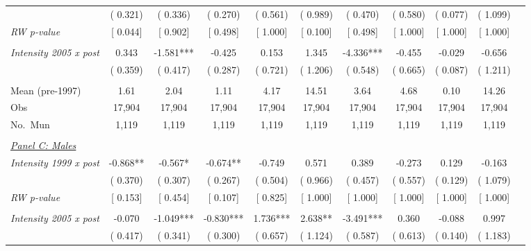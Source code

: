 \begin{tabular}{lcccccccccc}
 & (       0.321) & (       0.336) & (       0.270) & (       0.561) & (       0.989) & (       0.470) & (       0.580) & (       0.077) & (       1.099) \\ 
\textit{RW p-value} & [ 0.044] & [ 0.902] & [ 0.498] & [ 1.000] & [ 0.100] & [ 0.498] & [ 1.000] & [ 1.000] & [ 1.000] \\ 
  & & & & & & & & & \\ 
\textit{Intensity 2005 x post} &        0.343 &       -1.581*** &       -0.425 &        0.153 &        1.345 &       -4.336*** &       -0.455 &       -0.029 &       -0.656 \\ 
 & (       0.359) & (       0.417) & (       0.287) & (       0.721) & (       1.206) & (       0.548) & (       0.665) & (       0.087) & (       1.211) \\ 
  & & & & & & & & & \\ 
Mean (pre-1997) &         1.61 &         2.04 &         1.11 &         4.17 &        14.51 &         3.64 &         4.68 &         0.10 &        14.26 \\ 
Obs &       17,904 &       17,904 &       17,904 &       17,904 &       17,904 &       17,904 &       17,904 &       17,904 &       17,904 \\ 
No.\ Mun &        1,119 &        1,119 &        1,119 &        1,119 &        1,119 &        1,119 &        1,119 &        1,119 &        1,119 \\ 
  & & & & & & & & & \\ 
\underline{\textit{Panel C: Males}}  \\ 
\textit{Intensity 1999 x post} &       -0.868** &       -0.567* &       -0.674** &       -0.749 &        0.571 &        0.389 &       -0.273 &        0.129 &       -0.163 \\ 
 & (       0.370) & (       0.307) & (       0.267) & (       0.504) & (       0.966) & (       0.457) & (       0.557) & (       0.129) & (       1.079) \\ 
\textit{RW p-value} & [ 0.153] & [ 0.454] & [ 0.107] & [ 0.825] & [ 1.000] & [ 1.000] & [ 1.000] & [ 1.000] & [ 1.000] \\ 
  & & & & & & & & & \\ 
\textit{Intensity 2005 x post} &       -0.070 &       -1.049*** &       -0.830*** &        1.736*** &        2.638** &       -3.491*** &        0.360 &       -0.088 &        0.997 \\ 
 & (       0.417) & (       0.341) & (       0.300) & (       0.657) & (       1.124) & (       0.587) & (       0.613) & (       0.140) & (       1.183) \\ 

\end{tabular}
